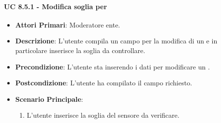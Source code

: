 				\paragraph{UC 8.5.1 - Modifica soglia per }
				\begin{itemize}
					\item \textbf{Attori Primari}: Moderatore ente.
					\item \textbf{Descrizione}: L'utente compila un campo per la modifica di un  e in particolare inserisce la soglia da controllare.
					\item \textbf{Precondizione}: L'utente sta inserendo i dati per modificare un .
					\item \textbf{Postcondizione}: L'utente ha compilato il campo richiesto.
					\item \textbf{Scenario Principale}:
					\begin{enumerate}
						\item{L'utente inserisce la soglia del sensore da verificare.}
					\end{enumerate}	
				\end{itemize}